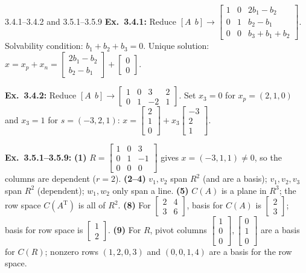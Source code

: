 \documentclass[11pt,a4paper,openany,oneside]{book}
\def\vect#1{#1}%
\def\mathbf#1{#1}%
\newcommand{\vect}[1]{\mathbf{#1}}
\newcommand{\T}{\mathrm{T}}
\numberwithin{equation}{chapter}
\begin{document}
\vfill
\begin{pageend_sol}{3.4.1--3.4.2 and 3.5.1--3.5.9}
\textbf{Ex.\ 3.4.1:} Reduce $[A \ \ \vect{b}] \to \begin{bmatrix}1 & 0 & 2b_1-b_2\\0 & 1 & b_2-b_1\\0 & 0 & b_3+b_1+b_2\end{bmatrix}$. Solvability condition: $b_1+b_2+b_3=0$. Unique solution: $\vect{x} = \vect{x}_p + \vect{x}_n = \begin{bmatrix}2b_1-b_2\\b_2-b_1\end{bmatrix} + \begin{bmatrix}0\\0\end{bmatrix}$.

\textbf{Ex.\ 3.4.2:} Reduce $[A \ \ \vect{b}] \to \begin{bmatrix}1 & 0 & 3 & 2\\0 & 1 & -2 & 1\end{bmatrix}$. Set $x_3=0$ for $\vect{x}_p=(2,1,0)$ and $x_3=1$ for $\vect{s}=(-3,2,1)$: $\vect{x} = \begin{bmatrix}2\\1\\0\end{bmatrix} + x_3\begin{bmatrix}-3\\2\\1\end{bmatrix}$.

\textbf{Ex.\ 3.5.1--3.5.9:} \textbf{(1)} $R = \begin{bmatrix}1 & 0 & 3\\0 & 1 & -1\\0 & 0 & 0\end{bmatrix}$ gives $\vect{x}=(-3,1,1) \neq \vect{0}$, so the columns are dependent ($r=2$). \textbf{(2--4)} $\vect{v}_1,\vect{v}_2$ span $\mathbf{R}^2$ (and are a basis); $\vect{v}_1,\vect{v}_2,\vect{v}_3$ span $\mathbf{R}^2$ (dependent); $\vect{w}_1,\vect{w}_2$ only span a line. \textbf{(5)} $C(A)$ is a plane in $\mathbf{R}^3$; the row space $C(A^\T)$ is all of $\mathbf{R}^2$. \textbf{(8)} For $\begin{bmatrix}2 & 4\\3 & 6\end{bmatrix}$, basis for $C(A)$ is $\begin{bmatrix}2\\3\end{bmatrix}$; basis for row space is $\begin{bmatrix}1\\2\end{bmatrix}$. \textbf{(9)} For $R$, pivot columns $\begin{bmatrix}1\\0\\0\end{bmatrix}, \begin{bmatrix}0\\1\\0\end{bmatrix}$ are a basis for $C(R)$; nonzero rows $(1,2,0,3)$ and $(0,0,1,4)$ are a basis for the row space.
\end{pageend_sol}
\end{document}
